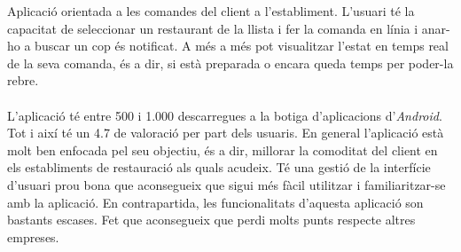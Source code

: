 Aplicació\cite{primetray} orientada a les comandes del client a l'establiment. L'usuari té la capacitat de seleccionar un restaurant de la llista i fer la comanda en línia i anar-ho a buscar un cop és notificat. A més a més pot visualitzar l'estat en temps real de la seva comanda, és a dir, si està preparada o encara queda temps per poder-la rebre.
\\\\
L'aplicació té entre 500 i 1.000 descarregues a la botiga d'aplicacions d'\textit{Android}. Tot i així té un 4.7 de valoració per part dels usuaris. En general l'aplicació està molt ben enfocada pel seu objectiu, és a dir, millorar la comoditat del client en els establiments de restauració als quals acudeix. Té una gestió de la interfície d'usuari prou bona que aconsegueix que sigui més fàcil utilitzar i familiaritzar-se amb la aplicació. En contrapartida, les funcionalitats d'aquesta aplicació son bastants escases. Fet que aconsegueix que perdi molts punts respecte altres empreses.
\\
